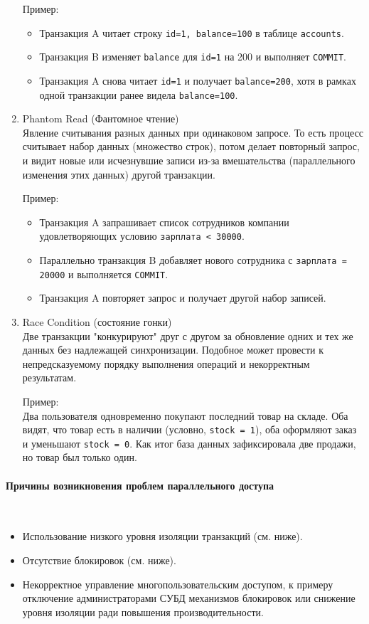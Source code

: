 \begin{enumerate}
    Пример:
    \begin{itemize}
        \item Транзакция A читает строку \texttt{id=1, balance=100} в таблице \texttt{accounts}.
        \item Транзакция B изменяет \texttt{balance} для \texttt{id=1} на 200 и выполняет \texttt{COMMIT}.
        \item Транзакция A снова читает \texttt{id=1} и получает \texttt{balance=200}, хотя в рамках одной транзакции ранее видела \texttt{balance=100}.
    \end{itemize}

    \item Phantom Read (Фантомное чтение) ~\\ 
    Явление считывания разных данных при одинаковом запросе. То есть процесс считывает набор данных (множество строк), потом делает повторный запрос, и видит новые или исчезнувшие записи из-за вмешательства (параллельного изменения этих данных) другой транзакции.

    Пример:
    \begin{itemize}
        \item Транзакция A запрашивает список сотрудников компании удовлетворяющих условию \texttt{зарплата < 30000}.
        \item Параллельно транзакция B добавляет нового сотрудника с \texttt{зарплата = 20000} и выполняется \texttt{COMMIT}.
        \item Транзакция A повторяет запрос и получает другой набор записей.
    \end{itemize}

    \item Race Condition (состояние гонки) ~\\
    Две транзакции "конкурируют" друг с другом за обновление одних и тех же данных без надлежащей синхронизации. Подобное может провести к непредсказуемому порядку выполнения операций и некорректным результатам.

    Пример: ~\\
    Два пользователя одновременно покупают последний товар на складе. Оба видят, что товар есть в наличии (условно, \texttt{stock = 1}), оба оформляют заказ и уменьшают \texttt{stock = 0}. Как итог база данных зафиксировала две продажи, но товар был только один.

\end{enumerate}

\paragraph{Причины возникновения проблем параллельного доступа} ~\\
\begin{itemize}
    \item Использование низкого уровня изоляции транзакций (см. ниже).
    \item Отсутствие блокировок (см. ниже).
    \item Некорректное управление многопользовательским доступом, к примеру отключение администраторами СУБД механизмов блокировок или снижение уровня изоляции ради повышения производительности.
\end{itemize}

